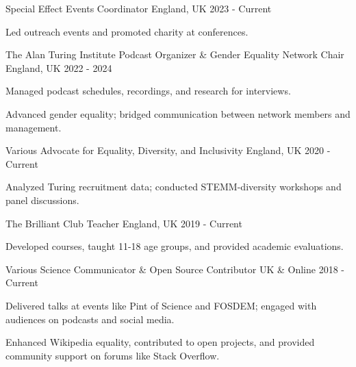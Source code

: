 
\begin{cventries}

\cventry
{Special Effect}
{Events Coordinator}
{England, UK}
{2023 - Current}
{
  \begin{cvitems}
    \item{Led outreach events and promoted charity at conferences.}
  \end{cvitems}
}

\cventry
{The Alan Turing Institute}
{Podcast Organizer \& Gender Equality Network Chair}
{England, UK}
{2022 - 2024}
{
  \begin{cvitems}
    \item{Managed podcast schedules, recordings, and research for interviews.}
    \item{Advanced gender equality; bridged communication between network members and management.}
  \end{cvitems}
}

\cventry
{Various}
{Advocate for Equality, Diversity, and Inclusivity}
{England, UK}
{2020 - Current}
{
  \begin{cvitems}
    \item{Analyzed Turing recruitment data; conducted STEMM-diversity workshops and panel discussions.}
  \end{cvitems}
}

\cventry
{The Brilliant Club}
{Teacher}
{England, UK}
{2019 - Current}
{
  \begin{cvitems}
    \item{Developed courses, taught 11-18 age groups, and provided academic evaluations.}
  \end{cvitems}
}

\cventry
{Various}
{Science Communicator \& Open Source Contributor}
{UK \& Online}
{2018 - Current}
{
  \begin{cvitems}
    \item{Delivered talks at events like Pint of Science and FOSDEM; engaged with audiences on podcasts and social media.}
    \item{Enhanced Wikipedia equality, contributed to open projects, and provided community support on forums like Stack Overflow.}
  \end{cvitems}
}

\end{cventries}
